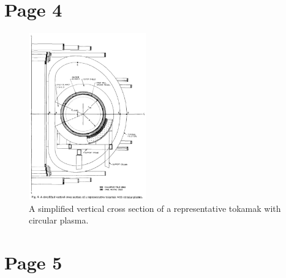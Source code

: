 \documentclass[11pt]{report} %
\begin{document}
\section{Page 4}
\begin{figure}[H]
  \centering
  \includegraphics[width=0.45\textwidth]{figs/tokamak.png}
  \caption{A simplified vertical cross section of a representative tokamak with circular plasma.}
\end{figure}

\section{Page 5}
\end{document}
